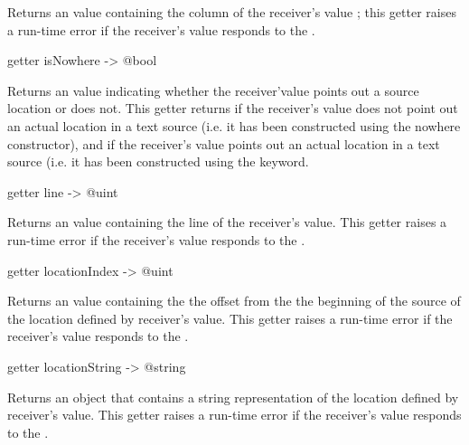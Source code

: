 Returns an  value containing the column of the receiver's value ; this getter raises a run-time error if the receiver's value responds  to the .



\begin{galgascode}
getter isNowhere -> @bool
\end{galgascode}

Returns an  value indicating whether the receiver'value points out a source location or does not. This getter returns  if the receiver's value does not point out an actual location in a text source (i.e. it has been constructed using the nowhere constructor), and  if the receiver's value points out an actual location in a text source (i.e. it has been constructed using the  keyword.



\begin{galgascode}
getter line -> @uint
\end{galgascode}

Returns an  value containing the line of the receiver's value. This getter raises a run-time error if the receiver's value responds  to the .



\begin{galgascode}
getter locationIndex -> @uint
\end{galgascode}

Returns an  value containing the the offset from the the beginning of the source of the location defined by receiver's value. This getter raises a run-time error if the receiver's value responds  to the .



\begin{galgascode}
getter locationString -> @string
\end{galgascode}

Returns an  object that contains a string representation of the location defined by receiver's value. This getter raises a run-time error if the receiver's value responds  to the .
